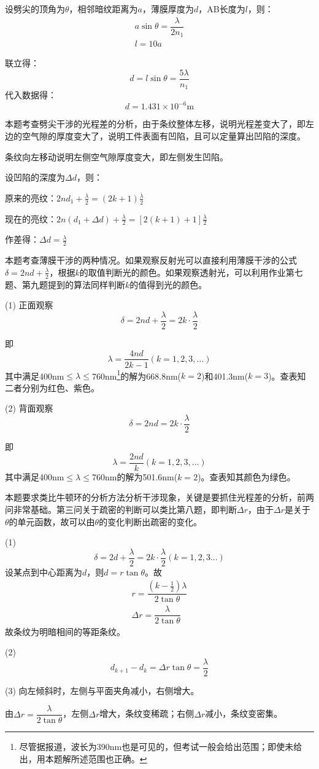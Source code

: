 \solve
设劈尖的顶角为$\theta$，相邻暗纹距离为$a$，薄膜厚度为$d$，AB长度为$l$，则：
\begin{gather*}
	a\sin\theta=\dfrac{\lambda}{2n_1}\\
	l=10a
\end{gather*}

联立得：
\[
d=l\sin\theta=\dfrac{5\lambda}{n_1}
\]
代入数据得：
\[
d=1.431\times 10^{-6}\mathrm{ m}
\]

\exercise 

\analysis
本题考查劈尖干涉的光程差的分析，由于条纹整体左移，说明光程差变大了，即左边的空气隙的厚度变大了，说明工件表面有凹陷，且可以定量算出凹陷的深度。

\solve
条纹向左移动说明左侧空气隙厚度变大，即左侧发生凹陷。

设凹陷的深度为$\Delta d$，则：

原来的亮纹：$2nd_1+\frac{\lambda}{2}=(2k+1)\frac{\lambda}{2}$

现在的亮纹：$2n(d_1+\Delta d)+\frac{\lambda}{2}=[2(k+1)+1]\frac{\lambda}{2}$

作差得：$\Delta d=\frac{\lambda}{2}$

\exercise 

\analysis
本题考查薄膜干涉的两种情况。如果观察反射光可以直接利用薄膜干涉的公式$\delta=2nd+\frac{\lambda}{2}$，根据$k$的取值判断光的颜色。如果观察透射光，可以利用作业第七题、第九题提到的算法同样判断$k$的值得到光的颜色。

\solve
(1) 正面观察
\[
\delta=2nd+\dfrac{\lambda}{2}=2k\cdot \dfrac{\lambda}{2}
\]

即
\[
\lambda=\dfrac{4nd}{2k-1}(k=1,2,3,...)
\]
其中满足400nm$\leqslant\lambda\leqslant$760nm\footnote{尽管据报道，波长为390nm也是可见的，但考试一般会给出范围；即使未给出，用本题解所述范围也正确。}的解为668.8nm($k=2$)和401.3nm($k=3$)。查表知二者分别为红色、紫色。

(2) 背面观察
\[
\delta=2nd=2k\cdot \frac{\lambda}{2}
\]

即
\[
\lambda=\dfrac{2nd}{k}(k=1,2,3,...)
\]
其中满足400nm$\leqslant\lambda\leqslant$760nm的解为501.6nm($k=2$)。查表知其颜色为绿色。

\exercise 

\analysis
本题要求类比牛顿环的分析方法分析干涉现象，关键是要抓住光程差的分析，前两问非常基础。第三问关于疏密的判断可以类比第八题，即判断$\Delta r$，由于$\Delta r$是关于$\theta$的单元函数，故可以由$\theta$的变化判断出疏密的变化。

\solve (1)
\[
\delta=2d+\dfrac{\lambda}{2}=2k\cdot \dfrac{\lambda}{2}(k=1,2,3...)
\]
设某点到中心距离为$d$，则$d=r\tan\theta$。故
\begin{gather*}
	r=\dfrac{(k-\frac{1}{2})\lambda}{2\tan\theta}\\
	\Delta r=\dfrac{\lambda}{2\tan\theta}
\end{gather*}
故条纹为明暗相间的等距条纹。

(2)
\[
d_{k+1}-d_k=\Delta r\tan\theta=\dfrac{\lambda}{2}
\]

(3)
向左倾斜时，左侧与平面夹角减小，右侧增大。

由$\Delta r=\dfrac{\lambda}{2\tan\theta}$，左侧$\Delta r$增大，条纹变稀疏；右侧$\Delta r$减小，条纹变密集。
